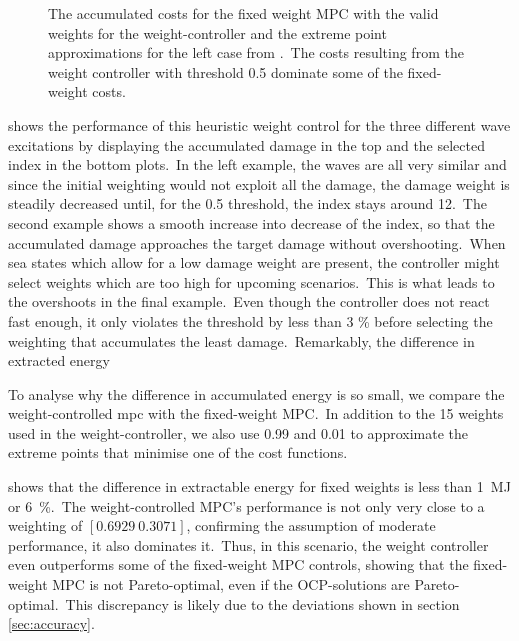 \begin{figure}[tb]
	\centering
	\fontsize{8}{0}\selectfont
	\def\svgwidth{0.49\textwidth}
	
	\caption{The accumulated costs for the fixed weight MPC with the valid weights for the weight-controller and the extreme point approximations for the left case from .\ The costs resulting from the weight controller with threshold 0.5 dominate some of the fixed-weight costs.}
	\label{fig:mpc_pf}
\end{figure}
\begin{figure*}[htb!]
	\centering
	\fontsize{8}{0}\selectfont
	\def\svgwidth{0.97\textwidth}
	
	\caption{Evaluation of the \ac{mpc} with weight controller for three wave scenarios and two target damage values.\ For clarity, only every 100th value is displayed. Top: Accumulated damage over time. Middle: The selected weight index \iw over time. A lower index corresponds to a higher weighting for the damage cost. Bottom: Extracted energy over time. For the lower damage thresholds, the extracted energy reduces only by 0.09, 0.05, and \SI{0.06}{\mega\joule} for the three cases, respectively.}
	\label{fig:weight_control}
\end{figure*}

 shows the performance of this heuristic weight control for the three different wave excitations by displaying the accumulated damage in the top and the selected index in the bottom plots.\ 
In the left example, the waves are all very similar and since the initial weighting would not exploit all the damage, the damage weight is steadily decreased until, for the 0.5 threshold, the index stays around 12.\
The second example shows a smooth increase into decrease of the index, so that the accumulated damage approaches the target damage without overshooting.\ 
When sea states which allow for a low damage weight are present, the controller might select weights which are too high for upcoming scenarios.\ 
This is what leads to the overshoots in the final example.\ 
Even though the controller does not react fast enough, it only violates the threshold by less than 3 \% before selecting the weighting that accumulates the least damage.\ 
Remarkably, the difference in extracted energy

To analyse why the difference in accumulated energy is so small, we compare the weight-controlled \ac{mpc} with the fixed-weight MPC.\ 
In addition to the 15 weights used in the weight-controller, we also use 0.99 and 0.01 to approximate the extreme points that minimise one of the cost functions.\ 

\figref{fig:mpc_pf} shows that the difference in extractable energy for fixed weights is less than \SI{1}{\mega\joule} or \SI{6}{\percent}.\ 
The weight-controlled MPC's performance is not only very close to a weighting of $[0.6929 \ 0.3071]$, confirming the assumption of moderate performance, it also dominates it.\ 
Thus, in this scenario, the weight controller even outperforms some of the fixed-weight MPC controls, showing that the fixed-weight MPC is not Pareto-optimal, even if the OCP-solutions are Pareto-optimal.\ 
This discrepancy is likely due to the deviations shown in section \ref{sec:accuracy}.
